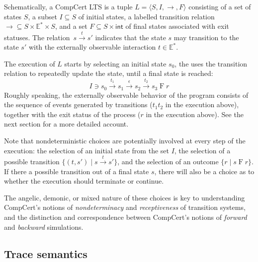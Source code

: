 \documentclass[draft,11pt]{report}
\theoremstyle{definition}
\newcommand{\kw}[1]{\ensuremath{ \mathsf{#1} }}
\begin{document}
Schematically, a CompCert LTS
is a tuple
$L = \langle S, I, {\rightarrow}, F \rangle$
consisting of
a set of states $S$,
a subset $I \subseteq S$ of initial states,
a labelled transition relation
${\rightarrow} \subseteq S \times \mathbb{E}^* \times S$,
and a set
$F \subseteq S \times \kw{int}$
of final states associated with exit statuses.
The relation~$s \stackrel{t}{\rightarrow} s'$
indicates that the state $s$ may transition to the state $s'$
with the externally observable interaction $t \in \mathbb{E}^*$.

The execution of $L$ starts by selecting an initial state $s_0$,
the uses the transition relation to repeatedly update the state,
until a final state is reached:
\[
  I \ni s_0
  \xrightarrow{t_1} s_1
  \xrightarrow{\epsilon} s_2
  \xrightarrow{t_2} s_3
  \mathrel{F} r
\]
Roughly speaking,
the externally observable behavior of the program
consists of the sequence of events generated by transitions
($t_1 t_2$ in the execution above),
together with the exit status of the process
($r$ in the execution above).
See the next section for a more detailed account.

Note that nondeterministic choices
are potentially involved at every step of the execution:
the selection of an initial state from the set $I$,
the selection of a possible transition $\{ (t, s') \mid s \xrightarrow{t} s' \}$,
and the selection of an outcome $\{ r \mid s \mathrel{F} r \}$.
If there a possible transition out of a final state $s$,
there will also be a choice as to whether the execution should terminate
or continue.

The angelic, demonic, or mixed nature of these choices
is key to understanding CompCert's
notions of \emph{nondeterminacy} and \emph{receptiveness}
of transition systems,
and the distinction and correspondence between
CompCert's notions of \emph{forward} and \emph{backward} simulations.

\subsection{Trace semantics}
\end{document}
